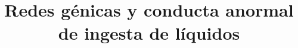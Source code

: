 \documentclass{bmcart}
\begin{document}
	\begin{frontmatter}
	
		\begin{fmbox}
			
			
			\title{Redes génicas y conducta anormal de ingesta de líquidos}
			
			
			\author[
			  addressref={aff1},                   %
			  corref={aff1},                       %
			  email={alvarogv@uma.es}   	%
			]{ }
			\author[
			addressref={aff1},
			email={barakat@uma.es}
			]{ } 
			\author[
			  addressref={aff1},
			  email={john.RS.Smith@cambridge.co.uk}
			]{ }
			
			
			\address[id=aff1]{%
			  ,             %
			  ,          %
			  ,                              %
			}
		
		\end{fmbox}%
		
		\begin{abstractbox}
		
			\begin{abstract} %
			
			

\end{abstract}
\end{abstractbox}
\end{frontmatter}
\end{document}
